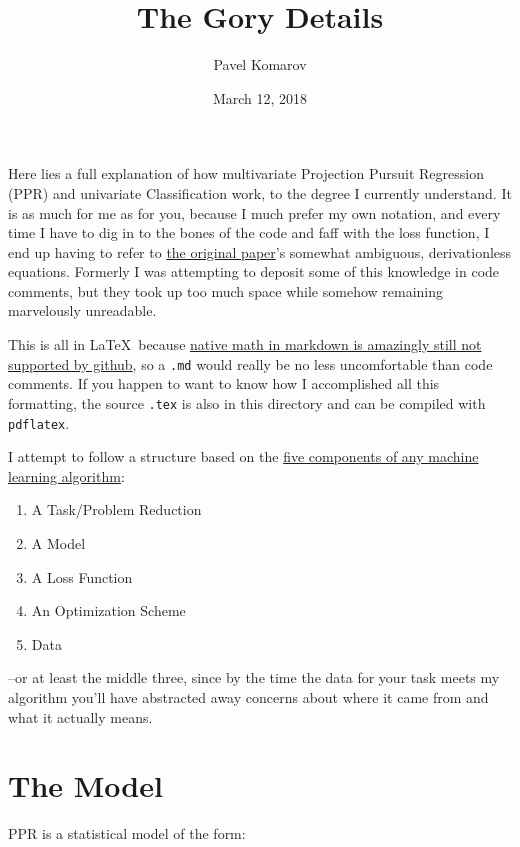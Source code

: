 \documentclass[12pt]{article}
\begin{document}
\title{The Gory Details}
\author{Pavel Komarov}
\date{March 12, 2018}
\maketitle

Here lies a full explanation of how multivariate Projection Pursuit Regression (PPR) and univariate Classification work, to the degree I currently understand. It is as much for me as for you, because I much prefer my own notation, and every time I have to dig in to the bones of the code and faff with the loss function, I end up having to refer to \href{http://www.slac.stanford.edu/cgi-wrap/getdoc/slac-pub-3824.pdf}{the original paper}'s somewhat ambiguous, derivationless equations. Formerly I was attempting to deposit some of this knowledge in code comments, but they took up too much space while somehow remaining marvelously unreadable.

This is all in \LaTeX\ because \href{https://github.com/github/markup/issues/897}{native math in markdown is amazingly still not supported by github}, so a \texttt{.md} would really be no less uncomfortable than code comments. If you happen to want to know how I accomplished all this formatting, the source \texttt{.tex} is also in this directory and can be compiled with \texttt{pdflatex}.

I attempt to follow a structure based on the \href{http://lmgtfy.com/?q=sorry+this+link+doesn\%27t+work+yet+I+still+have+to+post+those+slides}{five components of any machine learning algorithm}:

\begin{enumerate}
	\setlength\itemsep{-2mm}
	\item A Task/Problem Reduction
	\item A Model
	\item A Loss Function
	\item An Optimization Scheme
	\item Data
\end{enumerate}

--or at least the middle three, since by the time the data for your task meets my algorithm you'll have abstracted away concerns about where it came from and what it actually means.

\section{The Model}

PPR is a statistical model of the form:
\end{document}
